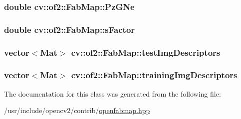 \hypertarget{classcv_1_1of2_1_1FabMap_a0bf851f305f6a00d5a837a7c70e40f3d}{
\subsubsection[{Pz\-G\-Ne}]{\setlength{\rightskip}{0pt plus 5cm}double cv\-::of2\-::\-Fab\-Map\-::\-Pz\-G\-Ne\hspace{0.3cm}{\ttfamily [protected]}}}\label{classcv_1_1of2_1_1FabMap_a0bf851f305f6a00d5a837a7c70e40f3d}
\hypertarget{classcv_1_1of2_1_1FabMap_a2283bacbeb4cae2c01ba1e0fbc9c4974}{
\subsubsection[{s\-Factor}]{\setlength{\rightskip}{0pt plus 5cm}double cv\-::of2\-::\-Fab\-Map\-::s\-Factor\hspace{0.3cm}{\ttfamily [protected]}}}\label{classcv_1_1of2_1_1FabMap_a2283bacbeb4cae2c01ba1e0fbc9c4974}
\hypertarget{classcv_1_1of2_1_1FabMap_a46f350e86965ec1e00ae4bd629dd4c8d}{
\subsubsection[{test\-Img\-Descriptors}]{\setlength{\rightskip}{0pt plus 5cm}vector$<$Mat$>$ cv\-::of2\-::\-Fab\-Map\-::test\-Img\-Descriptors\hspace{0.3cm}{\ttfamily [protected]}}}\label{classcv_1_1of2_1_1FabMap_a46f350e86965ec1e00ae4bd629dd4c8d}
\hypertarget{classcv_1_1of2_1_1FabMap_ac5c54c9cca20b7ffb83ac10a591e60fe}{
\subsubsection[{training\-Img\-Descriptors}]{\setlength{\rightskip}{0pt plus 5cm}vector$<$Mat$>$ cv\-::of2\-::\-Fab\-Map\-::training\-Img\-Descriptors\hspace{0.3cm}{\ttfamily [protected]}}}\label{classcv_1_1of2_1_1FabMap_ac5c54c9cca20b7ffb83ac10a591e60fe}


The documentation for this class was generated from the following file\-:\begin{DoxyCompactItemize}
\item 
/usr/include/opencv2/contrib/\hyperlink{openfabmap_8hpp}{openfabmap.\-hpp}\end{DoxyCompactItemize}
